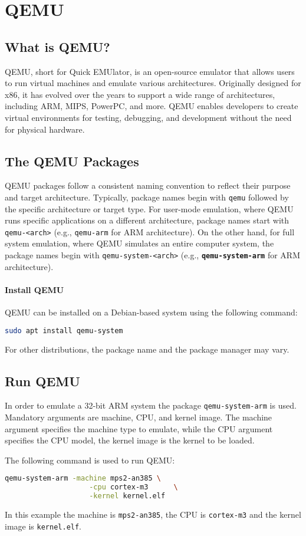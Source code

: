 \section{QEMU}
\subsection{What is QEMU?}
QEMU, short for Quick EMUlator, is an open-source emulator that allows users to run virtual machines and emulate various architectures. Originally designed for x86, it has evolved over the years to support a wide range of architectures, including ARM, MIPS, PowerPC, and more. QEMU enables developers to create virtual environments for testing, debugging, and development without the need for physical hardware.

\subsection{The QEMU Packages}
QEMU packages follow a consistent naming convention to reflect their purpose and target architecture. Typically, package names begin with \texttt{qemu} followed by the specific architecture or target type. For user-mode emulation, where QEMU runs specific applications on a different architecture, package names start with \texttt{qemu-<arch>} (e.g., \texttt{qemu-arm} for ARM architecture). On the other hand, for full system emulation, where QEMU simulates an entire computer system, the package names begin with \texttt{qemu-system-<arch>} (e.g., \texttt{\textbf{qemu-system-arm}} for ARM architecture).

\paragraph{Install QEMU}
QEMU can be installed on a Debian-based system using the following command:
\begin{lstlisting}[language=bash]
    sudo apt install qemu-system
\end{lstlisting}
For other distributions, the package name and the package manager may vary.

\subsection{Run QEMU}
In order to emulate a 32-bit ARM system the package \texttt{qemu-system-arm} is used. Mandatory arguments are machine, CPU, and kernel image. The machine argument specifies the machine type to emulate, while the CPU argument specifies the CPU model, the kernel image is the kernel to be loaded.

\vspace{\baselineskip}

The following command is used to run QEMU:
\begin{lstlisting}[language=bash]
    qemu-system-arm -machine mps2-an385 \
                    -cpu cortex-m3      \
                    -kernel kernel.elf
\end{lstlisting}

In this example the machine is \texttt{mps2-an385}, the CPU is \texttt{cortex-m3} and the kernel image is \texttt{kernel.elf}.